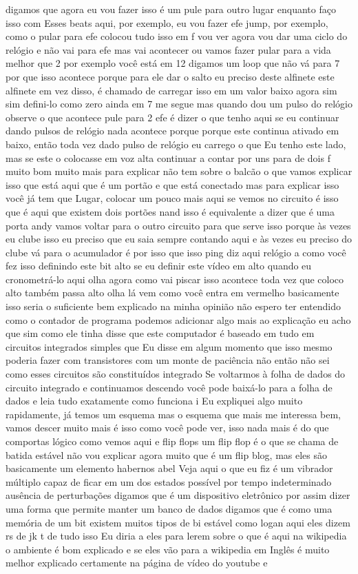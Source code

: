 \documentclass[oneside,11pt]{memoir} %
\begin{document}
digamos que agora eu vou fazer isso é um  pule para outro lugar enquanto faço isso com  Esses beats aqui, por exemplo, eu vou  fazer efe jump, por exemplo, como o  pular para efe colocou tudo isso em f  vou ver agora vou dar uma  ciclo do relógio e não vai para efe  mas vai acontecer ou vamos fazer  pular para a vida  melhor que 2 por exemplo você está em 12  digamos um loop que não vá para 7  por que isso acontece porque para ele dar o  salto eu preciso deste alfinete este alfinete  em vez disso, é chamado de carregar isso em um  valor baixo agora sim sim defini-lo como zero  ainda em 7 me segue mas quando dou um  pulso do relógio observe o que acontece pule  para 2  efe é dizer o que tenho aqui se eu continuar  dando pulsos de relógio  nada acontece porque porque este continua  ativado em baixo, então toda vez  dado pulso de relógio eu carrego o que  Eu tenho este lado, mas se este o colocasse  em voz alta continuar a contar por uns para  de dois f  muito bom muito mais para explicar não tem  sobre o balcão o que vamos  explicar isso que está aqui que é um  portão e  que está conectado  mas para explicar isso você já tem que  Lugar, colocar  um pouco mais aqui  se vemos no circuito é isso que é  aqui  que existem dois portões nand isso  é equivalente a dizer que é uma porta  andy  vamos voltar para o outro circuito  para que serve isso porque às vezes eu  clube isso eu preciso que eu saia sempre  contando aqui e às vezes eu preciso do  clube vá para o acumulador é por isso que isso  ping diz aqui relógio a como você fez isso  definindo este bit alto se eu definir  este vídeo em alto quando eu cronometrá-lo  aqui olha agora como vai piscar  isso acontece toda vez que coloco  alto também passa alto olha lá vem  como você entra  em vermelho  basicamente isso seria o suficiente  bem explicado na minha opinião não espero  ter entendido como o  contador de programa  podemos adicionar algo mais ao  explicação eu acho que sim como ele tinha  disse que este computador é baseado em tudo  em circuitos integrados simples que  Eu disse em algum momento que isso mesmo  poderia fazer com transistores com um monte de  paciência não então não sei como  esses circuitos são constituídos  integrado  Se voltarmos à folha de dados do  circuito integrado e continuamos descendo  você pode baixá-lo para a folha de dados e  leia tudo exatamente como funciona i  Eu expliquei algo muito rapidamente, já temos um  esquema  mas o esquema que mais me interessa  bem, vamos descer muito mais é isso  como você pode ver, isso nada mais é do que comportas  lógico como vemos aqui e flip flops um  flip flop é o que se chama de  batida estável não vou explicar agora  muito que é um flip blog, mas eles são  basicamente um elemento habernos abel  Veja aqui o que eu fiz  é um vibrador múltiplo capaz de  ficar em um dos estados  possível por tempo indeterminado  ausência de perturbações digamos que é um  dispositivo eletrônico por assim dizer  uma forma que permite manter um banco de dados  digamos que é como uma memória de um bit  existem muitos tipos de bi estável como  logan aqui eles dizem rs de jk t de tudo isso  Eu diria a eles para lerem sobre o que é aqui  na wikipedia o ambiente é bom  explicado e se eles vão para a wikipedia em  Inglês é muito melhor explicado  certamente na página de vídeo do youtube e  
\end{document}
